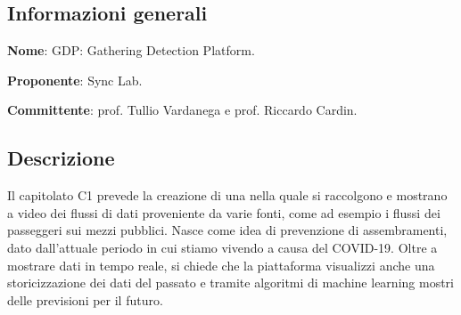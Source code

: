 \documentclass[../studio-di-fattibilita.tex]{subfiles}
\begin{document}
\subsection{Informazioni generali}%
\label{sub:informazioni_generale}
\begin{description}
  \item \textbf{Nome}: GDP: Gathering Detection Platform.
  \item \textbf{Proponente}: Sync Lab.
  \item \textbf{Committente}: prof. Tullio Vardanega e prof. Riccardo Cardin.
\end{description}

\subsection{Descrizione}%
\label{sub:descrizione}
Il capitolato C1 prevede la creazione di una  nella quale si raccolgono e mostrano a video dei flussi di dati proveniente da varie fonti, come ad esempio i flussi dei passeggeri sui mezzi pubblici. Nasce come idea di prevenzione di assembramenti, dato dall’attuale periodo in cui stiamo vivendo a causa del COVID-19. Oltre a mostrare dati in tempo reale, si chiede che la piattaforma visualizzi anche una storicizzazione dei dati del passato e tramite algoritmi di machine learning mostri delle previsioni per il futuro.
\end{document}
